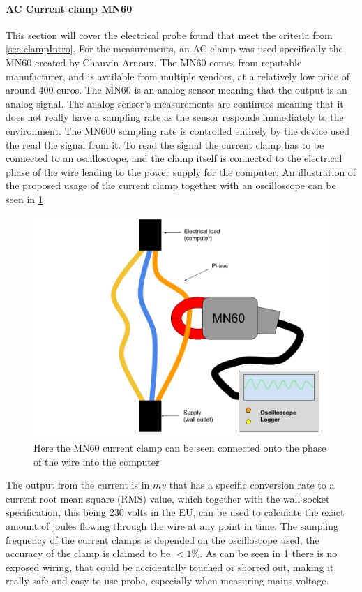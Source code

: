\paragraph*{AC Current clamp MN60}

This section will cover the electrical probe found that meet the criteria from \ref{sec:clampIntro}. For the measurements, an AC clamp was used specifically the MN60 created by Chauvin Arnoux. The MN60 comes from reputable manufacturer, and is available from multiple vendors, at a relatively low price of around 400 euros. The MN60 is an analog sensor meaning that the output is an analog signal\cite{agarwal2005foundations}. The analog sensor's measurements are continuos meaning that it does not really have a sampling rate as the sensor responds immediately to the environment. The MN600 sampling rate is controlled entirely by the device used the read the signal from it. To read the signal the current clamp has to be connected to an oscilloscope, and the clamp itself is connected to the electrical phase of the wire leading to the power supply for the computer. An illustration of the proposed usage of the current clamp together with an oscilloscope can be seen in \cref{fig:clampSetup}
\begin{figure}[h!]
    \centering
    \includegraphics*[scale=0.4]{figures/CLAMP.png}
    \caption{Here the MN60 current clamp can be seen connected onto the phase of the wire into the computer}
    \label{fig:clampSetup}
\end{figure}
The output from the current is in $mv$ that has a specific conversion rate to a current root mean square (RMS) value, which together with the wall socket specification, this being 230 volts in the EU, can be used to calculate the exact amount of joules flowing through the wire at any point in time. The sampling frequency of the current clamps is depended on the oscilloscope used, the accuracy of the clamp is claimed to be $<1\%$\cite{ClampDoc}. As can be seen in \ref{fig:clampSetup} there is no exposed wiring, that could be accidentally touched or shorted out, making it really safe and easy to use probe, especially when measuring mains voltage.


